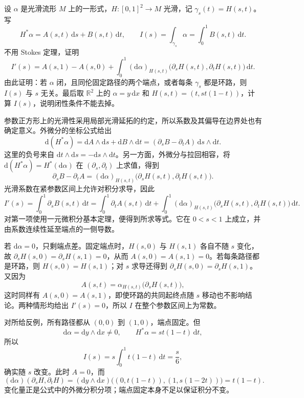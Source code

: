 \begin{exercise}\label{g1:ex:path-homotopy-integral}
	设 \(\alpha\) 是光滑流形 \(M\) 上的一形式，\(H:[0,1]^2\to M\) 光滑，记 \(\gamma_s(t)=H(s,t)\)。写
	\[
		H^*\alpha=A(s,t)\,\mathrm{d}s+B(s,t)\,\mathrm{d}t,\qquad
		I(s)=\int_{\gamma_s}\alpha=\int_0^1B(s,t)\,\mathrm{d}t.
	\]
	不用 Stokes 定理，证明
	\[
		I'(s)=A(s,1)-A(s,0)+\int_0^1(\mathrm{d}\alpha)_{H(s,t)}
		\bigl(\partial_sH(s,t),\partial_tH(s,t)\bigr)\,\mathrm{d}t.
	\]
	由此证明：若 \(\alpha\) 闭，且同伦固定路径的两个端点，或者每条 \(\gamma_s\) 都是环路，则 \(I(s)\) 与 \(s\) 无关。最后取 \(\mathbb R^2\) 上的 \(\alpha=y\,\mathrm{d}x\) 和 \(H(s,t)=(t,st(1-t))\)，计算 \(I(s)\)，说明闭性条件不能去掉。
\end{exercise}
\begin{solution}
	参数正方形上的光滑性采用局部光滑延拓的约定，所以系数及其偏导在边界处也有确定意义。外微分的坐标公式给出
	\[
		\mathrm{d}(H^*\alpha)
		=\mathrm{d}A\wedge\mathrm{d}s+\mathrm{d}B\wedge\mathrm{d}t
		=(\partial_sB-\partial_tA)\,\mathrm{d}s\wedge\mathrm{d}t.
	\]
	这里的负号来自 \(\mathrm{d}t\wedge\mathrm{d}s=-\mathrm{d}s\wedge\mathrm{d}t\)。另一方面，外微分与拉回相容，将 \(\mathrm{d}(H^*\alpha)=H^*(\mathrm{d}\alpha)\) 在 \((\partial_s,\partial_t)\) 上求值，得到
	\[
		\partial_sB-\partial_tA
		=(\mathrm{d}\alpha)_{H(s,t)}
		\bigl(\partial_sH(s,t),\partial_tH(s,t)\bigr).
	\]
	光滑系数在紧参数区间上允许对积分求导，因此
	\[
		I'(s)=\int_0^1\partial_sB(s,t)\,\mathrm{d}t
		=\int_0^1\partial_tA(s,t)\,\mathrm{d}t
		+\int_0^1(\mathrm{d}\alpha)_{H(s,t)}
		\bigl(\partial_sH(s,t),\partial_tH(s,t)\bigr)\,\mathrm{d}t.
	\]
	对第一项使用一元微积分基本定理，便得到所求等式。它在 \(0<s<1\) 上成立，并由系数连续性延至端点的一侧导数。

	若 \(\mathrm{d}\alpha=0\)，只剩端点差。固定端点时，\(H(s,0)\) 与 \(H(s,1)\) 各自不随 \(s\) 变化，故 \(\partial_sH(s,0)=\partial_sH(s,1)=0\)，从而 \(A(s,0)=A(s,1)=0\)。若每条路径都是环路，则 \(H(s,0)=H(s,1)\)；对 \(s\) 求导还得到 \(\partial_sH(s,0)=\partial_sH(s,1)\)。又因为
	\[
		A(s,t)=\alpha_{H(s,t)}\bigl(\partial_sH(s,t)\bigr),
	\]
	这时同样有 \(A(s,0)=A(s,1)\)，即使环路的共同起终点随 \(s\) 移动也不影响结论。两种情形均给出 \(I'(s)=0\)，所以 \(I\) 在整个参数区间上为常数。

	对所给反例，所有路径都从 \((0,0)\) 到 \((1,0)\)，端点固定。但
	\[
		\mathrm{d}\alpha=\mathrm{d}y\wedge\mathrm{d}x\ne0,\qquad
		H^*\alpha=st(1-t)\,\mathrm{d}t,
	\]
	所以
	\[
		I(s)=s\int_0^1t(1-t)\,\mathrm{d}t=\frac{s}{6},
	\]
	确实随 \(s\) 改变。此时 \(A=0\)，而
	\[
		(\mathrm{d}\alpha)(\partial_sH,\partial_tH)
		=(\mathrm{d}y\wedge\mathrm{d}x)\bigl((0,t(1-t)),(1,s(1-2t))\bigr)=t(1-t).
	\]
	变化量正是公式中的外微分积分项；端点固定本身不足以保证积分不变。
\end{solution}

